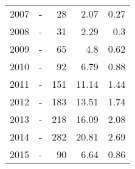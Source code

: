 \begin{longtable}{lXrrr}
        2007 & \multicolumn{1}{X}{-} & %
          \num{28} &
          \num[round-mode=places,round-precision=2]{2.07} &
          \num[round-mode=places,round-precision=2]{0.27} \\

        2008 & \multicolumn{1}{X}{-} & %
          \num{31} &
          \num[round-mode=places,round-precision=2]{2.29} &
          \num[round-mode=places,round-precision=2]{0.3} \\

        2009 & \multicolumn{1}{X}{-} & %
          \num{65} &
          \num[round-mode=places,round-precision=2]{4.8} &
          \num[round-mode=places,round-precision=2]{0.62} \\

        2010 & \multicolumn{1}{X}{-} & %
          \num{92} &
          \num[round-mode=places,round-precision=2]{6.79} &
          \num[round-mode=places,round-precision=2]{0.88} \\

        2011 & \multicolumn{1}{X}{-} & %
          \num{151} &
          \num[round-mode=places,round-precision=2]{11.14} &
          \num[round-mode=places,round-precision=2]{1.44} \\

        2012 & \multicolumn{1}{X}{-} & %
          \num{183} &
          \num[round-mode=places,round-precision=2]{13.51} &
          \num[round-mode=places,round-precision=2]{1.74} \\

        2013 & \multicolumn{1}{X}{-} & %
          \num{218} &
          \num[round-mode=places,round-precision=2]{16.09} &
          \num[round-mode=places,round-precision=2]{2.08} \\

        2014 & \multicolumn{1}{X}{-} & %
          \num{282} &
          \num[round-mode=places,round-precision=2]{20.81} &
          \num[round-mode=places,round-precision=2]{2.69} \\

        2015 & \multicolumn{1}{X}{-} & %
          \num{90} &
          \num[round-mode=places,round-precision=2]{6.64} &
          \num[round-mode=places,round-precision=2]{0.86} \\


\end{longtable}
